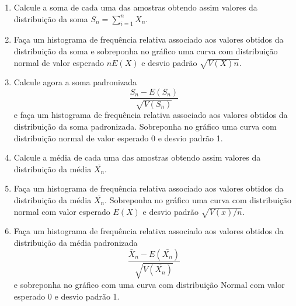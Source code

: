 \documentclass[
]{book}
\begin{document}
\begin{enumerate}
\def\labelenumi{(\alph{enumi})}
\item
  Calcule a soma de cada uma das amostras obtendo assim valores da distribuição da soma \(S_{n} = \sum_{i=1}^{n}X_{n}\).
\item
  Faça um histograma de frequência relativa associado aos valores obtidos da distribuição da soma e sobreponha no gráfico uma curva com distribuição normal de valor esperado \(nE(X)\) e desvio padrão \(\sqrt{V(X)n}\).
\item
  Calcule agora a soma padronizada \[\frac{S_{n}-E(S_{n})}{\sqrt{V(S_{n})}}\] e faça um histograma de frequência relativa associado aos valores obtidos da distribuição da soma padronizada. Sobreponha no gráfico uma curva com distribuição normal de valor esperado 0 e desvio padrão 1.
\item
  Calcule a média de cada uma das amostras obtendo assim valores da distribuição da média \(\bar{X_{n}}\).
\item
  Faça um histograma de frequência relativa associado aos valores obtidos da distribuição da média \(\bar{X_{n}}\). Sobreponha no gráfico uma curva com distribuição normal com valor esperado \(E(X)\) e desvio padrão \(\sqrt{V(x)/n}\).
\item
  Faça um histograma de frequência relativa associado aos valores obtidos da distribuição da média padronizada \[\frac{\bar{X}_{n}-E(\bar{X_{n}})}{\sqrt{V(\bar{X_{n}})}}\] e sobreponha no gráfico com uma curva com distribuição Normal com valor esperado 0 e desvio padrão 1.
\end{enumerate}

  
\end{document}
